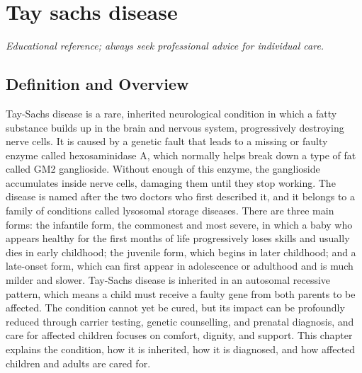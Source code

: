 \chapter{Tay sachs disease}

\medskip
\noindent\textit{Educational reference; always seek professional advice for individual care.}

\section*{Definition and Overview}
Tay-Sachs disease is a rare, inherited neurological condition in which a fatty substance builds up in the brain and nervous system, progressively destroying nerve cells. It is caused by a genetic fault that leads to a missing or faulty enzyme called hexosaminidase A, which normally helps break down a type of fat called GM2 ganglioside. Without enough of this enzyme, the ganglioside accumulates inside nerve cells, damaging them until they stop working. The disease is named after the two doctors who first described it, and it belongs to a family of conditions called lysosomal storage diseases. There are three main forms: the infantile form, the commonest and most severe, in which a baby who appears healthy for the first months of life progressively loses skills and usually dies in early childhood; the juvenile form, which begins in later childhood; and a late-onset form, which can first appear in adolescence or adulthood and is much milder and slower. Tay-Sachs disease is inherited in an autosomal recessive pattern, which means a child must receive a faulty gene from both parents to be affected. The condition cannot yet be cured, but its impact can be profoundly reduced through carrier testing, genetic counselling, and prenatal diagnosis, and care for affected children focuses on comfort, dignity, and support. This chapter explains the condition, how it is inherited, how it is diagnosed, and how affected children and adults are cared for.

